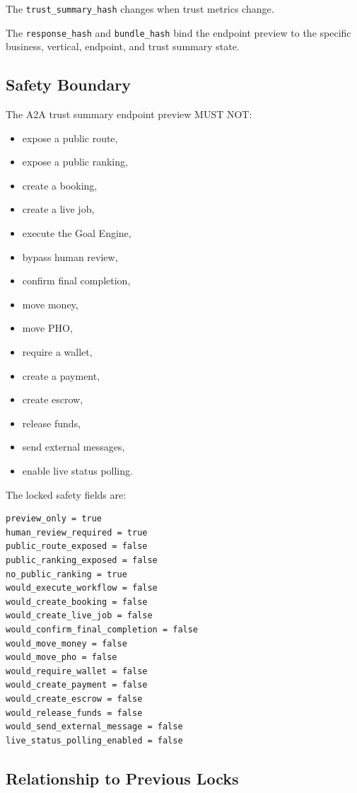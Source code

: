 The \texttt{trust\_summary\_hash} changes when trust metrics change.

The \texttt{response\_hash} and \texttt{bundle\_hash} bind the endpoint preview to the specific business, vertical, endpoint, and trust summary state.

\subsection{Safety Boundary}

The A2A trust summary endpoint preview MUST NOT:

\begin{itemize}
  \item expose a public route,
  \item expose a public ranking,
  \item create a booking,
  \item create a live job,
  \item execute the Goal Engine,
  \item bypass human review,
  \item confirm final completion,
  \item move money,
  \item move PHO,
  \item require a wallet,
  \item create a payment,
  \item create escrow,
  \item release funds,
  \item send external messages,
  \item enable live status polling.
\end{itemize}

The locked safety fields are:

\begin{verbatim}
preview_only = true
human_review_required = true
public_route_exposed = false
public_ranking_exposed = false
no_public_ranking = true
would_execute_workflow = false
would_create_booking = false
would_create_live_job = false
would_confirm_final_completion = false
would_move_money = false
would_move_pho = false
would_require_wallet = false
would_create_payment = false
would_create_escrow = false
would_release_funds = false
would_send_external_message = false
live_status_polling_enabled = false
\end{verbatim}

\subsection{Relationship to Previous Locks}

